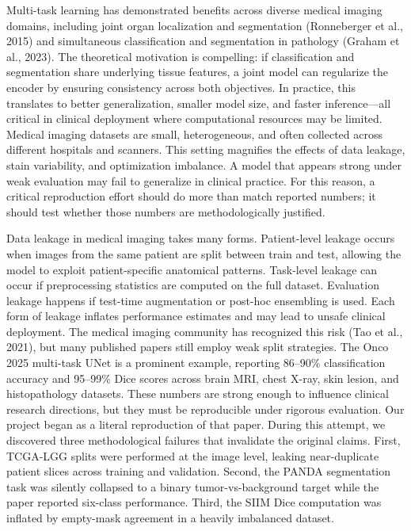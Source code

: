 \documentclass[conference,a4paper]{IEEEtran}
\begin{document}
Multi-task learning has demonstrated benefits across diverse medical imaging domains, including joint organ localization and segmentation (Ronneberger et al., 2015) and simultaneous classification and segmentation in pathology (Graham et al., 2023). The theoretical motivation is compelling: if classification and segmentation share underlying tissue features, a joint model can regularize the encoder by ensuring consistency across both objectives. In practice, this translates to better generalization, smaller model size, and faster inference—all critical in clinical deployment where computational resources may be limited.
Medical imaging datasets are small, heterogeneous, and often collected across different hospitals and scanners. This setting magnifies the effects of data leakage, stain variability, and optimization imbalance. A model that appears strong under weak evaluation may fail to generalize in clinical practice. For this reason, a critical reproduction effort should do more than match reported numbers; it should test whether those numbers are methodologically justified.

Data leakage in medical imaging takes many forms. Patient-level leakage occurs when images from the same patient are split between train and test, allowing the model to exploit patient-specific anatomical patterns. Task-level leakage can occur if preprocessing statistics are computed on the full dataset. Evaluation leakage happens if test-time augmentation or post-hoc ensembling is used. Each form of leakage inflates performance estimates and may lead to unsafe clinical deployment. The medical imaging community has recognized this risk (Tao et al., 2021), but many published papers still employ weak split strategies.
The Onco 2025 multi-task UNet is a prominent example, reporting 86--90\% classification accuracy and 95--99\% Dice scores across brain MRI, chest X-ray, skin lesion, and histopathology datasets. These numbers are strong enough to influence clinical research directions, but they must be reproducible under rigorous evaluation. Our project began as a literal reproduction of that paper. During this attempt, we discovered three methodological failures that invalidate the original claims. First, TCGA-LGG splits were performed at the image level, leaking near-duplicate patient slices across training and validation. Second, the PANDA segmentation task was silently collapsed to a binary tumor-vs-background target while the paper reported six-class performance. Third, the SIIM Dice computation was inflated by empty-mask agreement in a heavily imbalanced dataset.
\end{document}

